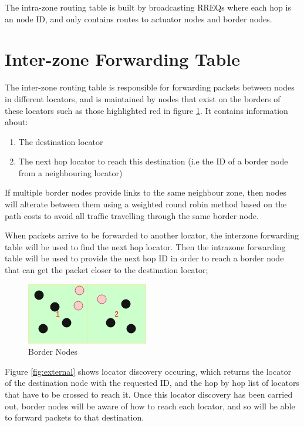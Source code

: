 \documentclass[12pt]{article}
\begin{document}
The intra-zone routing table is built by broadcasting RREQs where each hop is an node ID, and only contains routes to actuator nodes and border nodes. 

\section{Inter-zone Forwarding Table}

The inter-zone routing table is responsible for forwarding packets between nodes in different locators, and is maintained by nodes that exist on the borders of these locators such as those highlighted red in figure \ref{fig:border}. It contains information about:

\begin{enumerate}
	\item The destination locator 
	\item The next hop locator to reach this destination (i.e the ID of a border node from a neighbouring locator)
\end{enumerate}

If multiple border nodes provide links to the same neighbour zone, then nodes will alterate between them using a weighted round robin method based on the path costs to avoid all traffic travelling through the same border node.

When packets arrive to be forwarded to another locator, the interzone forwarding table will be used to find the next hop locator. Then the intrazone forwarding table will be used to provide the next hop ID in order to reach a border node that can get the packet closer to the destination locator;

\begin{figure}[!ht]
	\centering
	\includegraphics[width=0.5\linewidth]{images/nb}
	\caption{Border Nodes}
	\label{fig:border}
\end{figure}

Figure \ref{fig:external} shows locator discovery occuring, which returns the locator of the destination node with the requested ID, and the hop by hop list of locators that have to be crossed to reach it.
Once this locator discovery has been carried out, border nodes will be aware of how to reach each locator, and so will be able to forward packets to that destination.
\end{document}
